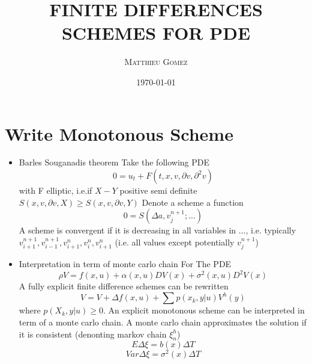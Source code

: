 \documentclass[english]{article}
\begin{document}
\title{\vspace{-4.5ex} \large{\textbf{\MakeUppercase{Finite Differences Schemes for PDE}}}\vspace{1ex}}
\author{\large{\textsc{Matthieu Gomez}}}
\date{\today}
\maketitle
\tableofcontents
\newpage

\section{Write Monotonous Scheme}
\begin{itemize}
	\item 	Barles Souganadis theorem
	Take the following PDE
	$$0 = u_t + F(t, x, v, \partial v, \partial^2 v)$$
	with F elliptic, i.e.if $X - Y$ positive semi definite
	$S(x, v, \partial v, X) \geq S(x, v, \partial v, Y)$
	Denote a scheme a function 
	$$0 = S(\Delta a, v_j^{n+1} ; ...)$$
	A scheme is convergent if it is decreasing in all variables in ..., i.e.  typically $v_{i+1}^{n+1}, v_{i-1}^{n+1}, v_{i+1}^{n}, v_{i}^{n}, v_{i+1}^{n}$  (i.e. all values except potentially $v_j^{n+1}$)
	\item Interpretation in term of  monte carlo chain
	For The PDE
	$$\rho V = f(x, u) + \alpha(x, u) DV(x) + \sigma^2(x, u) D^2 V(x)$$
	A fully explicit finite difference schemes can be rewritten
	$$V =  V + \Delta f(x, u) + \sum p(x_k, y|u)V^h(y) $$
	where $p(X_k, y|u) \geq 0$.  An explicit monotonous scheme can be interpreted in term of a monte carlo chain.
	A monte carlo chain approximates the solution if it is consistent (denonting markov chain $\xi^h_n$)
	$$E\Delta \xi = b(x) \Delta T$$
	$$Var\Delta \xi = \sigma^2 (x) \Delta T$$
\end{itemize}
\end{document}
